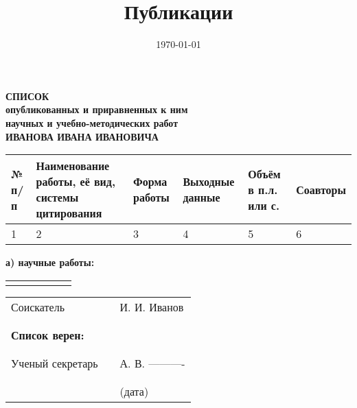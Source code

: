 \documentclass[10pt, a4paper]{article}
\title{Публикации}
\author{}
\date{\today}
\begin{document}
\begin{center}
    \textbf{СПИСОК}\\
    \textbf{опубликованных и приравненных к ним}\\
    \textbf{научных и учебно-методических работ}\\
    \vspace{1em}
    \textbf{ИВАНОВА ИВАНА ИВАНОВИЧА}
\end{center}

\begin{center}

\begin{tabular}{|p{13mm}|p{34mm}|p{15mm}|p{35mm}|p{20mm}|p{29mm}|}
\hline
№ п/п & Наименование
работы,  её вид,
системы цитирования & Форма
работы & Выходные
данные & Объём
в п.л. или 
с. & Соавторы \\
\hline
1 & 2 & 3 & 4 & 5 & 6 \\
\hline
\end{tabular}

\begin{flushleft}
\textbf{а) научные работы:}
\end{flushleft}

\begin{longtable}{|p{13mm}|p{34mm}|p{15mm}|p{35mm}|p{20mm}|p{29mm}|}
\hline
\endfirsthead
\hline
\endhead
\hline
\endfoot
\hline
\endlastfoot

\end{longtable}
\end{center}

\vspace{2em}

\begin{tabularx}{.9\textwidth}{lXl}
    Соискатель & & И. И. Иванов \\
    & & \\
    & & \\
    \textbf{Список  верен:} & & \\
    & & \\
    & & \\
    Ученый секретарь & & А. В. ---------- \\
    & & \\
    & & \\
    & & (дата)
\end{tabularx}
\end{document}

